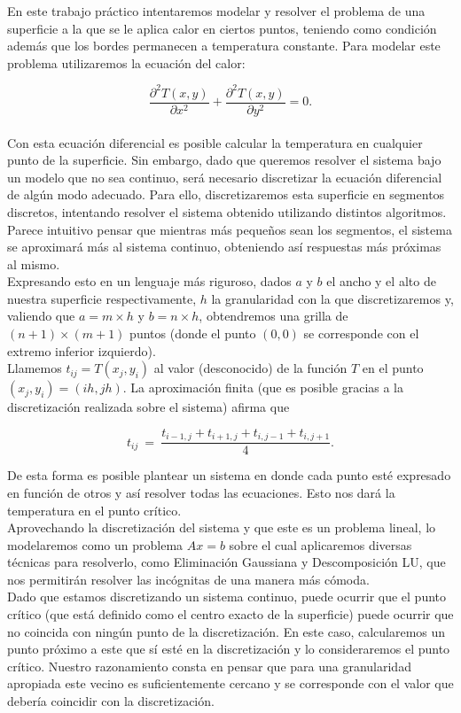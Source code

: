 En este trabajo práctico intentaremos modelar y resolver el problema de una superficie a la que se le aplica calor en ciertos puntos, teniendo como condición además que los bordes permanecen a temperatura constante. Para modelar este problema utilizaremos la ecuación del calor:

\begin{equation}
\frac{\partial^2T(x,y)}{\partial x^{2}}+\frac{\partial^2 T(x,y)}{\partial y^{2}} = 0.
\end{equation}\\

Con esta ecuación diferencial es posible calcular la temperatura en cualquier punto de la superficie. Sin embargo, dado que queremos resolver el sistema bajo un modelo que no sea continuo, será necesario discretizar la ecuación diferencial de algún modo adecuado. Para ello, discretizaremos esta superficie en segmentos discretos, intentando resolver el sistema obtenido utilizando distintos algoritmos. Parece intuitivo pensar que mientras más pequeños sean los segmentos, el sistema se aproximará más al sistema continuo, obteniendo así respuestas más próximas al mismo.
\\
Expresando esto en un lenguaje más riguroso, dados $a$ y $b$ el ancho y el alto de nuestra superficie respectivamente, $h$ la granularidad con la que discretizaremos y, valiendo que $a = m\times h$ y $b = n \times h$, obtendremos una grilla de $(n+1)\times(m+1)$ puntos (donde el punto $(0,0)$ se corresponde con el extremo inferior izquierdo).
\\
Llamemos $t_{ij} = T(x_j,y_i)$ al valor (desconocido) de la función $T$ en el punto $(x_j, y_i) = (ih, jh)$. La aproximación finita (que es posible gracias a la discretización realizada sobre el sistema) afirma que

\begin{equation}
t_{ij} \ =\ \frac{ t_{i-1,j} + t_{i+1,j} + t_{i,j-1} + t_{i,j+1}}{4}.
\end{equation}

De esta forma es posible plantear un sistema en donde cada punto esté expresado en función de otros y así resolver todas las ecuaciones. Esto nos dará la temperatura en el punto crítico.
\\
Aprovechando la discretización del sistema y que este es un problema lineal, lo modelaremos como un problema $Ax=b$ sobre el cual aplicaremos diversas técnicas para resolverlo, como Eliminación Gaussiana y Descomposición LU, que nos permitirán resolver las incógnitas de una manera más cómoda.
\\
Dado que estamos discretizando un sistema continuo, puede ocurrir que el punto crítico (que está definido como el centro exacto de la superficie) puede ocurrir que no coincida con ningún punto de la discretización. En este caso, calcularemos un punto próximo a este que sí esté en la discretización y lo consideraremos el punto crítico. Nuestro razonamiento consta en pensar que para una granularidad apropiada este vecino es suficientemente cercano y se corresponde con el valor que debería coincidir con la discretización.

